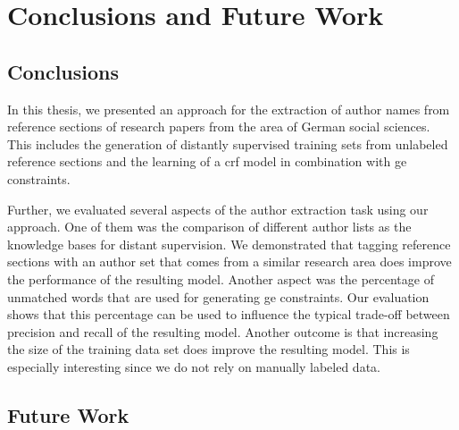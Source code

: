 \chapter{Conclusions and Future Work}\label{cha:conclusion-and-future-work}
\section{Conclusions}\label{sec:conclusion}
In this thesis, we presented an approach for the extraction of author names from reference sections of research papers from the area of German social sciences.
This includes the generation of distantly supervised training sets from unlabeled reference sections and the learning of a \gls{crf} model in combination with \gls{ge} constraints.

Further, we evaluated several aspects of the author extraction task using our approach.
One of them was the comparison of different author lists as the knowledge bases for distant supervision.
We demonstrated that tagging reference sections with an author set that comes from a similar research area does improve the performance of the resulting model.
Another aspect was the percentage of unmatched words that are used for generating \gls{ge} constraints.
Our evaluation shows that this percentage can be used to influence the typical trade-off between \gls{precision} and \gls{recall} of the resulting model.
Another outcome is that increasing the size of the training data set does improve the resulting model.
This is especially interesting since we do not rely on manually labeled data.


\section{Future Work}\label{sec:future-work}

\itodo{}



